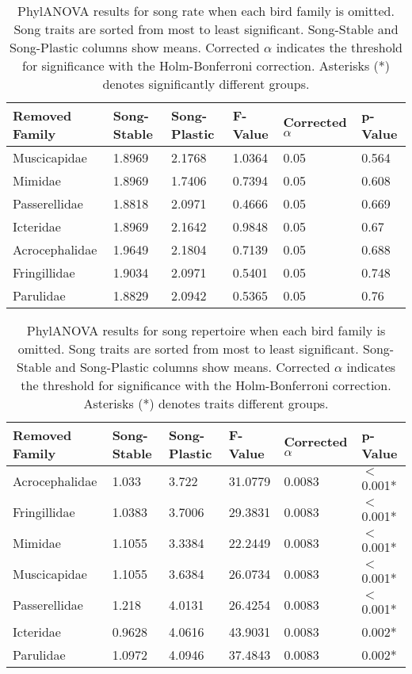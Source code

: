 \documentclass[a4paper,12pt]{article}
\begin{document}
\begin{table}[ht]
\caption{PhylANOVA results for song rate when each bird family is omitted. Song traits are sorted from most to least significant. Song-Stable and Song-Plastic columns show means. Corrected $\alpha$ indicates the threshold for significance with the Holm-Bonferroni correction. Asterisks (*) denotes significantly different groups.}
\centering
\begin{tabular}{llllll}
  \hline
Removed Family & Song-Stable & Song-Plastic & F-Value & Corrected $\alpha$ & p-Value \\ 
  \hline
Muscicapidae & 1.8969 & 2.1768 & 1.0364 & 0.05 & 0.564 \\ 
  Mimidae & 1.8969 & 1.7406 & 0.7394 & 0.05 & 0.608 \\ 
  Passerellidae & 1.8818 & 2.0971 & 0.4666 & 0.05 & 0.669 \\ 
  Icteridae & 1.8969 & 2.1642 & 0.9848 & 0.05 & 0.67 \\ 
  Acrocephalidae & 1.9649 & 2.1804 & 0.7139 & 0.05 & 0.688 \\ 
  Fringillidae & 1.9034 & 2.0971 & 0.5401 & 0.05 & 0.748 \\ 
  Parulidae & 1.8829 & 2.0942 & 0.5365 & 0.05 & 0.76 \\ 
   \hline
\end{tabular}
\end{table}

\begin{table}[ht]
\caption{PhylANOVA results for song repertoire when each bird family is omitted. Song traits are sorted from most to least significant. Song-Stable and Song-Plastic columns show means. Corrected $\alpha$ indicates the threshold for significance with the Holm-Bonferroni correction. Asterisks (*) denotes traits different groups.}
\centering
\begin{tabular}{llllll}
  \hline
Removed Family & Song-Stable & Song-Plastic & F-Value & Corrected $\alpha$ & p-Value \\ 
  \hline
Acrocephalidae & 1.033 & 3.722 & 31.0779 & 0.0083 & $<$0.001* \\ 
  Fringillidae & 1.0383 & 3.7006 & 29.3831 & 0.0083 & $<$0.001* \\ 
  Mimidae & 1.1055 & 3.3384 & 22.2449 & 0.0083 & $<$0.001* \\ 
  Muscicapidae & 1.1055 & 3.6384 & 26.0734 & 0.0083 & $<$0.001* \\ 
  Passerellidae & 1.218 & 4.0131 & 26.4254 & 0.0083 & $<$0.001* \\ 
  Icteridae & 0.9628 & 4.0616 & 43.9031 & 0.0083 & 0.002* \\ 
  Parulidae & 1.0972 & 4.0946 & 37.4843 & 0.0083 & 0.002* \\ 
   \hline
\end{tabular}
\end{table}
\end{document}
